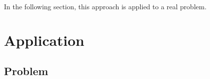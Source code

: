 \documentclass[]{elsarticle}
\theoremstyle{definition}
\begin{document}
%
% 
%

In the following section, this approach is applied to a real problem.





\section{Application}\label{application}

\subsection{Problem}
\end{document}
